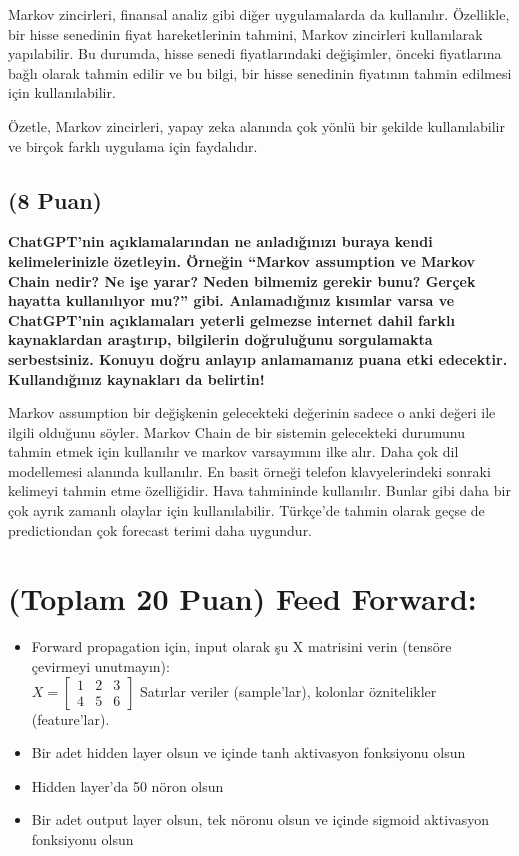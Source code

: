 \documentclass[11pt]{article}
\begin{document}
Markov zincirleri, finansal analiz gibi diğer uygulamalarda da kullanılır. Özellikle, bir hisse senedinin fiyat hareketlerinin tahmini, Markov zincirleri kullanılarak yapılabilir. Bu durumda, hisse senedi fiyatlarındaki değişimler, önceki fiyatlarına bağlı olarak tahmin edilir ve bu bilgi, bir hisse senedinin fiyatının tahmin edilmesi için kullanılabilir.

Özetle, Markov zincirleri, yapay zeka alanında çok yönlü bir şekilde kullanılabilir ve birçok farklı uygulama için faydalıdır.



\subsection{(8 Puan)} \textbf{ChatGPT’nin açıklamalarından ne anladığınızı buraya kendi kelimelerinizle özetleyin. Örneğin ``Markov assumption ve Markov Chain nedir? Ne işe yarar? Neden bilmemiz gerekir bunu? Gerçek hayatta kullanılıyor mu?'' gibi. Anlamadığınız kısımlar varsa ve ChatGPT’nin açıklamaları yeterli gelmezse internet dahil farklı kaynaklardan araştırıp, bilgilerin doğruluğunu sorgulamakta serbestsiniz. Konuyu doğru anlayıp anlamamanız puana etki edecektir. Kullandığınız kaynakları da belirtin!}

Markov assumption bir değişkenin gelecekteki değerinin sadece o anki değeri ile ilgili olduğunu söyler. Markov Chain de bir sistemin gelecekteki durumunu tahmin etmek için kullanılır ve markov varsayımını ilke alır. Daha çok dil modellemesi alanında kullanılır. En basit örneği telefon klavyelerindeki sonraki kelimeyi tahmin etme özelliğidir. Hava tahmininde kullanılır. Bunlar gibi daha bir çok ayrık zamanlı olaylar için kullanılabilir.
Türkçe'de tahmin olarak geçse de predictiondan çok forecast terimi daha uygundur.

\section{(Toplam 20 Puan) Feed Forward:}
 
\begin{itemize}
    \item Forward propagation için, input olarak şu X matrisini verin (tensöre çevirmeyi unutmayın):\\
    $X = \begin{bmatrix}
        1 & 2 & 3\\
        4 & 5 & 6
        \end{bmatrix}$
    Satırlar veriler (sample'lar), kolonlar öznitelikler (feature'lar).
    \item Bir adet hidden layer olsun ve içinde tanh aktivasyon fonksiyonu olsun
    \item Hidden layer'da 50 nöron olsun
    \item Bir adet output layer olsun, tek nöronu olsun ve içinde sigmoid aktivasyon fonksiyonu olsun
\end{itemize}
\end{document}
